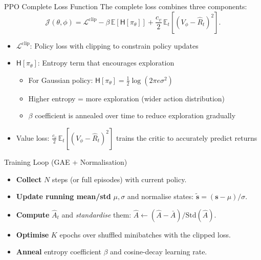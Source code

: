 \documentclass[10pt,aspectratio=169]{beamer}
\begin{document}
\begin{frame}{PPO Complete Loss Function}
\small
The complete loss combines three components:
\begin{equation*}
\mathcal{J}(\theta,\phi)=\mathcal{L}^{\text{clip}}-\beta\,\mathbb{E}[\mathsf{H}[\pi_\theta]]+\dfrac{c_v}{2}\,\mathbb{E}_t[(V_\phi-\hat{R}_t)^2].
\end{equation*}

\begin{itemize}
  \item $\mathcal{L}^{\text{clip}}$: Policy loss with clipping to constrain policy updates
  \item $\mathsf{H}[\pi_\theta]$: Entropy term that encourages exploration
  \begin{itemize}
    \item For Gaussian policy: $\mathsf{H}[\pi_\theta] = \frac{1}{2}\log(2\pi e \sigma^2)$
    \item Higher entropy = more exploration (wider action distribution)
    \item $\beta$ coefficient is annealed over time to reduce exploration gradually
  \end{itemize}
  \item Value loss: $\frac{c_v}{2}\,\mathbb{E}_t[(V_\phi-\hat{R}_t)^2]$ trains the critic to accurately predict returns
\end{itemize}
\end{frame}

\begin{frame}{Training Loop (GAE + Normalisation)}
\begin{itemize}
  \item \textbf{Collect} $N$ steps (or full episodes) with current policy.
  \item \textbf{Update running mean/std} $\mu,\sigma$ and normalise states: $\tilde{\bm{s}}=(\bm{s}-\mu)/\sigma$.
  \item \textbf{Compute} $\hat{A}_t$ and \emph{standardise} them: $\hat{A}\leftarrow(\hat{A}-\bar{A})/\text{Std}(\hat{A})$.
  \item \textbf{Optimise} $K$ epochs over shuffled minibatches with the clipped loss.
  \item \textbf{Anneal} entropy coefficient $\beta$ and cosine-decay learning rate.
\end{itemize}
\end{frame}

\end{document}
